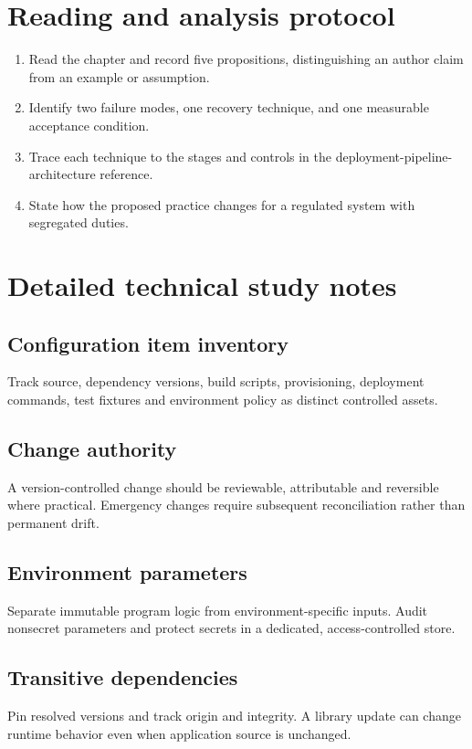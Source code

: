 \documentclass[10pt,letterpaper]{article}
\begin{document}
\section{Reading and analysis protocol}
\begin{enumerate}
\item Read the chapter and record five propositions, distinguishing an author claim from an example or assumption.
\item Identify two failure modes, one recovery technique, and one measurable acceptance condition.
\item Trace each technique to the stages and controls in the deployment-pipeline-architecture reference.
\item State how the proposed practice changes for a regulated system with segregated duties.
\end{enumerate}

\section{Detailed technical study notes}
\subsection{Configuration item inventory}
Track source, dependency versions, build scripts, provisioning, deployment commands, test fixtures and environment policy as distinct controlled assets.

\subsection{Change authority}
A version-controlled change should be reviewable, attributable and reversible where practical. Emergency changes require subsequent reconciliation rather than permanent drift.

\subsection{Environment parameters}
Separate immutable program logic from environment-specific inputs. Audit nonsecret parameters and protect secrets in a dedicated, access-controlled store.

\subsection{Transitive dependencies}
Pin resolved versions and track origin and integrity. A library update can change runtime behavior even when application source is unchanged.
\end{document}
